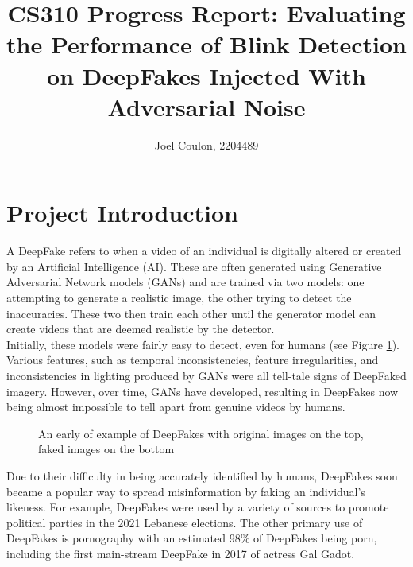 \documentclass{article}
\title{CS310 Progress Report: Evaluating the Performance of Blink Detection on DeepFakes Injected With Adversarial Noise}
\author{Joel Coulon, 2204489}
\date{}
\begin{document}
\maketitle

\section{Project Introduction}

A DeepFake refers to when a video of an individual is digitally altered or created by an Artificial Intelligence (AI). These are often generated using Generative Adversarial Network models (GANs) and are trained via two models: one attempting to generate a realistic image, the other trying to detect the inaccuracies. These two then train each other until the generator model can create videos that are deemed realistic by the detector.\\

Initially, these models were fairly easy to detect, even for humans (see Figure \ref{fig:earlyexample}). Various features, such as temporal inconsistencies, feature irregularities, and inconsistencies in lighting produced by GANs were all tell-tale signs of DeepFaked imagery. However, over time, GANs have developed, resulting in DeepFakes now being almost impossible to tell apart from genuine videos by humans.

\begin{figure}[H]
    \centering
    \caption{An early of example of DeepFakes with original images on the top, faked images on the bottom\cite{earlydeepfakeimage}}
    \label{fig:earlyexample}
\end{figure}

Due to their difficulty in being accurately identified by humans, DeepFakes soon became a popular way to spread misinformation by faking an individual's likeness. For example, DeepFakes were used by a variety of sources to promote political parties in the 2021 Lebanese elections\cite{misinformation}. The other primary use of DeepFakes is pornography with an estimated 98\% of DeepFakes being porn\cite{pornography}, including the first main-stream DeepFake in 2017 of actress Gal Gadot\cite{misinformation}.\\
\end{document}
